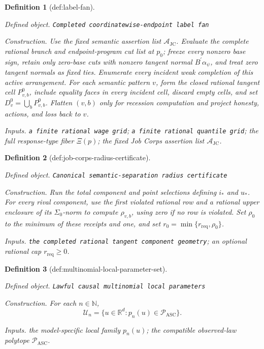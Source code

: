 \documentclass{article}
\newtheorem{definition}{Definition}
\begin{document}
\begin{definition}[def:label-fan]\label{def:label-fan}
\par\smallskip\noindent\emph{Defined object.} \texttt{Completed coordinatewise-\allowbreak{}endpoint label fan}
\par\smallskip\noindent\emph{Construction.} Use the fixed semantic assertion list \(\mathscr A_{\mathrm{JC}}\). Evaluate the complete rational branch and endpoint-program cut list at \(p_0\); freeze every nonzero base sign, retain only zero-base cuts with nonzero tangent normal \(B^{\prime}\alpha_{\psi}\), and treat zero tangent normals as fixed ties. Enumerate every incident weak completion of this active arrangement. For each semantic pattern \(v\), form the closed rational tangent cell \(P_{v,b}^0\), include equality faces in every incident cell, discard empty cells, and set \(D_v^0=\bigcup_bP_{v,b}^0\). Flatten \((v,b)\) only for recession computation and project honesty, actions, and loss back to \(v\).
\par\smallskip\noindent\emph{Inputs.} \texttt{a finite rational wage grid}; \texttt{a finite rational quantile grid}; the full response-type fiber \(\Xi(p)\); the fixed Job Corps assertion list \(\mathscr A_{\mathrm{JC}}\).
\end{definition}

\begin{definition}[def:job-corps-radius-certificate]\label{def:job-corps-radius-certificate}
\par\smallskip\noindent\emph{Defined object.} \texttt{Canonical semantic-\allowbreak{}separation radius certificate}
\par\smallskip\noindent\emph{Construction.} Run the total component and point selections defining \(i_*\) and \(u_*\). For every rival component, use the first violated rational row and a rational upper enclosure of its \(\Sigma_0\)-norm to compute \(\rho_{v,b}\), using zero if no row is violated. Set \(\rho_0\) to the minimum of these receipts and one, and set \(r_0=\min\{r_{\mathrm{req}},\rho_0\}\).
\par\smallskip\noindent\emph{Inputs.} \texttt{the completed rational tangent component geometry}; an optional rational cap \(r_{\mathrm{req}}\ge0\).
\end{definition}

\begin{definition}[def:multinomial-local-parameter-set]\label{def:multinomial-local-parameter-set}
\par\smallskip\noindent\emph{Defined object.} \texttt{Lawful causal multinomial local parameters}
\par\smallskip\noindent\emph{Construction.} For each \(n\in\mathbb N\),
\[
 \mathcal U_n=\{u\in\mathbb R^d:p_n(u)\in\mathcal P_{\mathrm{ASC}}\}.
\]
\par\smallskip\noindent\emph{Inputs.} the model-specific local family \(p_n(u)\); the compatible observed-law polytope \(\mathcal P_{\mathrm{ASC}}\).
\end{definition}
\end{document}
